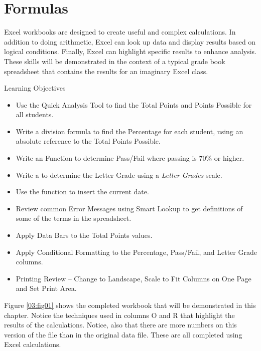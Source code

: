 \chapter{Formulas}\label{ch03:formulas}

Excel workbooks are designed to create useful and complex calculations. In addition to doing arithmetic, Excel can look up data and display results based on logical conditions. Finally, Excel can highlight specific results to enhance analysis. These skills will be demonstrated in the context of a typical grade book spreadsheet that contains the results for an imaginary Excel class.

\begin{center}
	\begin{objbox}{Learning Objectives}
		\begin{itemize}
			\setlength{\itemsep}{0pt}
			\setlength{\parskip}{0pt}
			\setlength{\parsep}{0pt}

			\item Use the Quick Analysis Tool to find the Total Points and Points Possible for all students.
			\item Write a division formula to find the Percentage for each student, using an absolute reference to the Total Points Possible.
			\item Write an  Function to determine Pass/Fail where passing is $ 70\% $ or higher.
			\item Write a  to determine the Letter Grade using a \textit{Letter Grades} scale.
			\item Use the  function to insert the current date.
			\item Review common Error Messages using Smart Lookup to get definitions of some of the terms in the spreadsheet.
			\item Apply Data Bars to the Total Points values.
			\item Apply Conditional Formatting to the Percentage, Pass/Fail, and Letter Grade columns.
			\item Printing Review – Change to Landscape, Scale to Fit Columns on One Page and Set Print Area.
			
		\end{itemize}
	\end{objbox}
\end{center}

Figure \ref{03:fig01} shows the completed workbook that will be demonstrated in this chapter. Notice the techniques used in columns O and R that highlight the results of the calculations. Notice, also that there are more numbers on this version of the file than in the original data file. These are all completed using Excel calculations.

